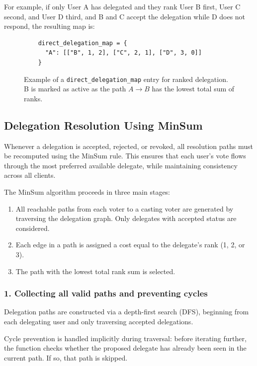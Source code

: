 For example, if only User A has delegated and they rank User B first, User C second, and User D third, and B and C accept the delegation while D does not respond, the resulting map is:

\begin{figure}[H]
  \begin{verbatim}
    direct_delegation_map = {
      "A": [["B", 1, 2], ["C", 2, 1], ["D", 3, 0]]
    }
  \end{verbatim}
  \caption{Example of a \texttt{direct\_delegation\_map} entry for ranked delegation. B is marked as active as the path $A\to B$ has the lowest total sum of ranks.}
\end{figure}

\subsection{Delegation Resolution Using MinSum}

Whenever a delegation is accepted, rejected, or revoked, all resolution paths must be recomputed using the MinSum rule. This ensures that each user's vote flows through the most preferred available delegate, while maintaining consistency across all clients.

The MinSum algorithm proceeds in three main stages:

\begin{enumerate}
    \item All reachable paths from each voter to a casting voter are generated by traversing the delegation graph. Only delegates with accepted status are considered.
    \item Each edge in a path is assigned a cost equal to the delegate's rank (1, 2, or 3).
    \item The path with the lowest total rank sum is selected.
\end{enumerate}

\subsubsection*{1. Collecting all valid paths and preventing cycles}

Delegation paths are constructed via a depth-first search (DFS), beginning from each delegating user and only traversing accepted delegations.

Cycle prevention is handled implicitly during traversal: before iterating further, the function checks whether the proposed delegate has already been seen in the current path. If so, that path is skipped.

